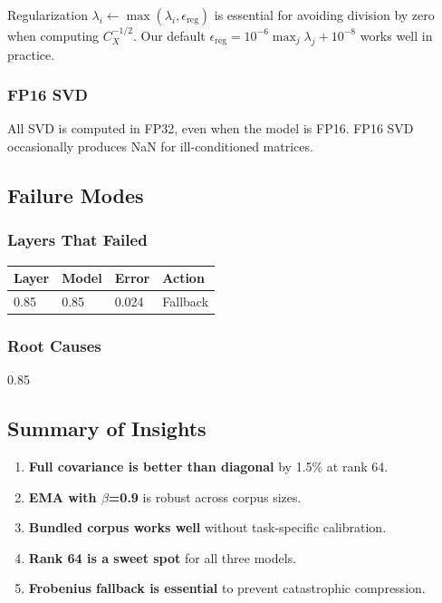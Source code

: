 Regularization $\lambda_i \leftarrow \max(\lambda_i, \epsilon_\text{reg})$ is 
essential for avoiding division by zero when computing $C_X^{-1/2}$. Our 
default $\epsilon_\text{reg} = 10^{-6} \max_j \lambda_j + 10^{-8}$ works 
well in practice.

\subsubsection{FP16 SVD}

All SVD is computed in FP32, even when the model is FP16. FP16 SVD 
occasionally produces NaN for ill-conditioned matrices.

\subsection{Failure Modes}

\subsubsection{Layers That Failed}

\begin{table}[H]
\centering
\small
\begin{tabular}{llll}
\toprule
\textbf{Layer} & \textbf{Model} & \textbf{Error} & \textbf{Action} \\
\midrule
0.85 & 0.85 & 0.024 & Fallback \\
\bottomrule
\end{tabular}
\end{table}

\subsubsection{Root Causes}

0.85

\subsection{Summary of Insights}

\begin{enumerate}
\item \textbf{Full covariance is better than diagonal} by 1.5\% at rank 64.
\item \textbf{EMA with $\beta$=0.9} is robust across corpus sizes.
\item \textbf{Bundled corpus works well} without task-specific calibration.
\item \textbf{Rank 64 is a sweet spot} for all three models.
\item \textbf{Frobenius fallback is essential} to prevent catastrophic compression.
\end{enumerate}